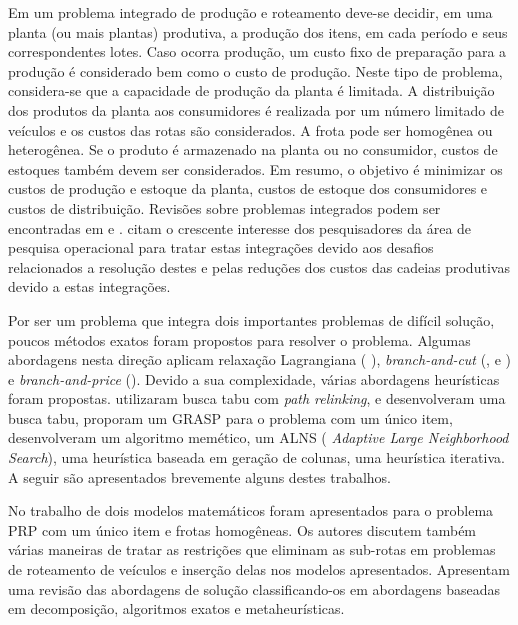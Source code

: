 \documentclass[11pt]{article}
\begin{document}
Em um problema integrado de produção e roteamento deve-se decidir, em uma planta (ou mais plantas) produtiva, a produção dos itens, em cada período e seus correspondentes lotes. Caso ocorra produção, um custo fixo de preparação para a produção é considerado bem como o custo de produção. Neste tipo de problema, considera-se que a capacidade de produção da planta é limitada.  A distribuição dos produtos da planta aos consumidores é realizada por um número limitado de veículos e os custos das rotas são considerados. A frota pode ser homogênea ou heterogênea. Se o produto é armazenado na planta ou no consumidor, custos de estoques também devem ser considerados. Em resumo, o objetivo é minimizar os custos de produção
 e estoque da planta, custos de estoque dos consumidores e custos de distribuição. Revisões sobre problemas integrados podem ser encontradas em 
 e .  citam o crescente interesse dos pesquisadores da área de pesquisa operacional para tratar estas integrações devido aos desafios relacionados a resolução destes e pelas reduções dos custos das cadeias produtivas devido a estas integrações. 

Por ser um problema que integra dois importantes problemas de difícil solução, poucos métodos exatos foram propostos para resolver o problema. 
Algumas abordagens nesta direção aplicam relaxação Lagrangiana ( ),\textit{ branch-and-cut} (,  e ) e  \textit{branch-and-price} ().
Devido a sua complexidade, várias abordagens heurísticas foram propostas.  utilizaram busca tabu com \textit{path relinking},  e  desenvolveram uma busca tabu,   proporam um GRASP para o problema com um único item,  desenvolveram um algoritmo memético,   um ALNS (\textit{ Adaptive Large Neighborhood Search}),  uma heurística baseada em geração de colunas,  uma heurística iterativa.  A seguir são apresentados brevemente alguns destes trabalhos. 

No trabalho de  dois modelos matemáticos foram apresentados para o problema PRP com um único item e frotas homogêneas. Os autores discutem também várias maneiras de tratar as restrições que eliminam as sub-rotas em problemas de roteamento de veículos e inserção delas nos modelos apresentados. Apresentam uma revisão das abordagens de solução classificando-os em abordagens baseadas em decomposição, algoritmos exatos e metaheurísticas.
\end{document}
